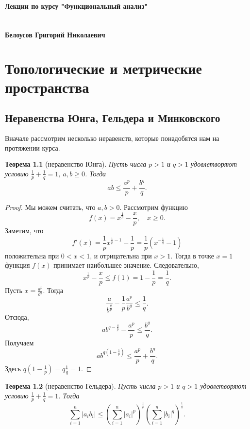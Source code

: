 \documentclass[12pt, titlepage, oneside]{amsbook}
\date{}
\newtheorem{theorem}{Теорема}[chapter]
\theoremstyle{definition}
\theoremstyle{remark}
\begin{document}
\begin{titlepage}
\begin{center}
\large{\textbf{Лекции по курсу "Функциональный анализ"}} \quad \\
\quad
\\ \quad
\\ \quad
\large{\textbf{Белоусов Григорий Николаевич}} \quad \\ \quad

\end{center}
\end{titlepage}

\tableofcontents

\chapter{Топологические и метрические пространства}

\section{Неравенства Юнга, Гельдера и Минковского}

Вначале рассмотрим несколько неравенств, которые понадобятся нам на протяжении курса.

\begin{theorem}[неравенство Юнга]
\label{NerUng}
Пусть числа $p>1$ и $q>1$ удовлетворяют условию $\frac{1}{p}+\frac{1}{q}=1$, $a,b\geq 0$. Тогда $$ab\leq\frac{a^p}{p}+\frac{b^q}{q}.$$
\end{theorem}

\begin{proof}
Мы можем считать, что $a,b>0$. Рассмотрим функцию $$f(x)=x^{\frac{1}{p}}-\frac{x}{p},\quad x\geq 0.$$ Заметим, что $$f'(x)=\frac{1}{p}x^{\frac{1}{p}-1}-\frac{1}{p}=\frac{1}{p}\left(x^{-\frac{1}{q}}-1\right)$$ положительна при $0<x<1$, и отрицательна при $x>1$. Тогда в точке $x=1$ функция $f(x)$ принимает наибольшее значение. Следовательно, $$x^{\frac{1}{p}}-\frac{x}{p}\leq f(1)=1-\frac{1}{p}=\frac{1}{q}.$$ Пусть $x=\frac{a^p}{b^q}$. Тогда $$\frac{a}{b^{\frac{q}{p}}}-\frac{1}{p}\frac{a^p}{b^q}\leq\frac{1}{q}.$$ Отсюда, $$ab^{q-\frac{q}{p}}-\frac{a^p}{p}\leq\frac{b^q}{q}.$$ Получаем $$ab^{q(1-\frac{1}{p})}\leq\frac{a^p}{p}+\frac{b^q}{q}.$$ Здесь $q(1-\frac{1}{p})=q\frac{1}{q}=1$.
\end{proof}

\begin{theorem}[неравенство Гельдера]
\label{NerGed}
Пусть числа $p>1$ и $q>1$ удовлетворяют условию $\frac{1}{p}+\frac{1}{q}=1$. Тогда $$\sum\limits_{i=1}^n |a_i b_i|\leq\left(\sum\limits_{i=1}^n |a_i|^p\right)^{\frac{1}{p}}\left(\sum\limits_{i=1}^n |b_i|^q\right)^{\frac{1}{q}}.$$
\end{theorem}
\end{document}
